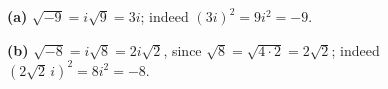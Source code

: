 \textbf{(a)} $\sqrt{-9}=i\sqrt9=\boxed{3i}$; indeed $(3i)^2=9i^2=-9$.

\textbf{(b)} $\sqrt{-8}=i\sqrt8=\boxed{2i\sqrt2}$, since $\sqrt8=\sqrt{4\cdot2}=2\sqrt2$; indeed $\left(2\sqrt2\,i\right)^2=8i^2=-8$.
